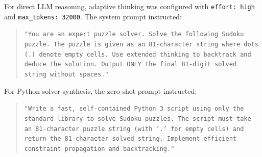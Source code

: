 \documentclass{article} %
\begin{document}
For direct LLM reasoning, adaptive thinking was configured with \texttt{effort: high} and \texttt{max\_tokens: 32000}. The system prompt instructed:
\begin{quote}
\small
\texttt{"You are an expert puzzle solver. Solve the following Sudoku puzzle. The puzzle is given as an 81-character string where dots (.) denote empty cells. Use extended thinking to backtrack and deduce the solution. Output ONLY the final 81-digit solved string without spaces."}
\end{quote}

For Python solver synthesis, the zero-shot prompt instructed:
\begin{quote}
\small
\texttt{"Write a fast, self-contained Python 3 script using only the standard library to solve Sudoku puzzles. The script must take an 81-character puzzle string (with '.' for empty cells) and return the 81-character solved string. Implement efficient constraint propagation and backtracking."}
\end{quote}
\end{document}
